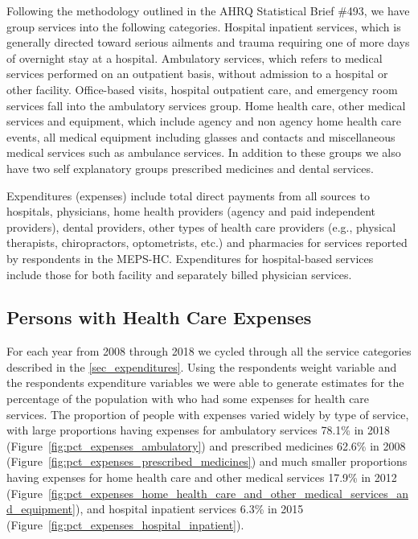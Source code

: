 \documentclass{ucetd}
\begin{document}
Following the methodology outlined in the AHRQ Statistical Brief \#493, we have group services into the following categories. Hospital inpatient services, which is generally directed toward serious ailments and trauma requiring one of more days of overnight stay at a hospital. Ambulatory services, which refers to medical services performed on an outpatient basis, without admission to a hospital or other facility. Office-based visits, hospital outpatient care, and emergency room services fall into the ambulatory services group. Home health care, other medical services and equipment, which include agency and non agency home health care events, all medical equipment including glasses and contacts and miscellaneous medical services such as ambulance services. In addition to these groups we also have two self explanatory groups prescribed medicines and dental services. \cite{statisticalbrief493}

Expenditures (expenses) include total direct payments from all sources to hospitals, physicians, home health providers (agency and paid independent providers), dental providers, other types of health care providers (e.g., physical therapists, chiropractors, optometrists, etc.) and pharmacies for services reported by respondents in the MEPS-HC. Expenditures for hospital-based services include those for both facility and separately billed physician services.

\subsection{ Persons with Health Care Expenses}
For each year from 2008 through 2018 we cycled through all the service categories described in the \ref{sec_expenditures}. Using the respondents weight variable and the respondents expenditure variables we were able to generate estimates for the percentage of the population with who had some expenses for health care services. The proportion of people with expenses varied widely by type of service, with large proportions having expenses for ambulatory services 78.1\% in 2018 (Figure~\ref{fig:pct_expenses_ambulatory}) and prescribed medicines 62.6\% in 2008 (Figure~\ref{fig:pct_expenses_prescribed_medicines}) and much smaller proportions having expenses for home health care and other medical services 17.9\% in 2012 (Figure~\ref{fig:pct_expenses_home_health_care_and_other_medical_services_and_equipment}), and hospital inpatient services 6.3\% in 2015 (Figure~\ref{fig:pct_expenses_hospital_inpatient}). 
\end{document}

